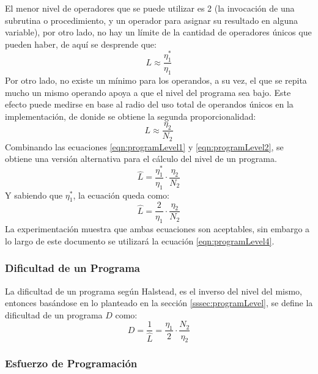 \documentclass[letterpaper,12pt]{article}
\begin{document}
El menor nivel de operadores que se puede utilizar es 2 (la invocación de una subrutina o procedimiento, y un operador para asignar su resultado en alguna variable), por otro lado, no hay un límite de la cantidad de operadores únicos que pueden haber, de aquí se desprende que:
\begin{equation}
  \label{eqn:programLevel1}
  L \approx \frac{\eta_{1}^{*}}{\eta_{1}}
\end{equation}
Por otro lado, no existe un mínimo para los operandos, a su vez, el que se repita mucho un mismo operando apoya a que el nivel del programa sea bajo. Este efecto puede medirse en base al radio del uso total de operandos únicos en la implementación, de donide se obtiene la segunda proporcionalidad:
\begin{equation}
  \label{eqn:programLevel2}
  L \approx \frac{\eta_{2}}{N_{2}}
\end{equation}
Combinando las ecuaciones \ref{eqn:programLevel1} y \ref{eqn:programLevel2}, se obtiene una versión alternativa para el cálculo del nivel de un programa.
\begin{equation}
  \label{eqn:programLevel3}
  \hat{L} = \frac{\eta_{1}^{*}}{\eta_{1}} \cdot \frac{\eta_{2}}{N_{2}}
\end{equation}
Y sabiendo que $\eta_{1}^{*}$, la ecuación queda como:
\begin{equation}
  \label{eqn:programLevel4}
  \hat{L} = \frac{2}{\eta_{1}} \cdot \frac{\eta_{2}}{N_{2}}
\end{equation}
La experimentación muestra que ambas ecuaciones son aceptables, sin embargo a lo largo de este documento se utilizará la ecuación \ref{eqn:programLevel4}.

\subsubsection{Dificultad de un Programa}

La dificultad de un programa según Halstead, es el inverso del nivel del mismo, entonces basándose en lo planteado en la sección \ref{sssec:programLevel}, se define la dificultad de un programa $D$ como:
\begin{equation}
  D = \frac{1}{\hat{L}} = \frac{\eta_{1}}{2} \cdot \frac{N_{2}}{\eta_{2}}
\end{equation}

\subsubsection{Esfuerzo de Programación}
\end{document}
